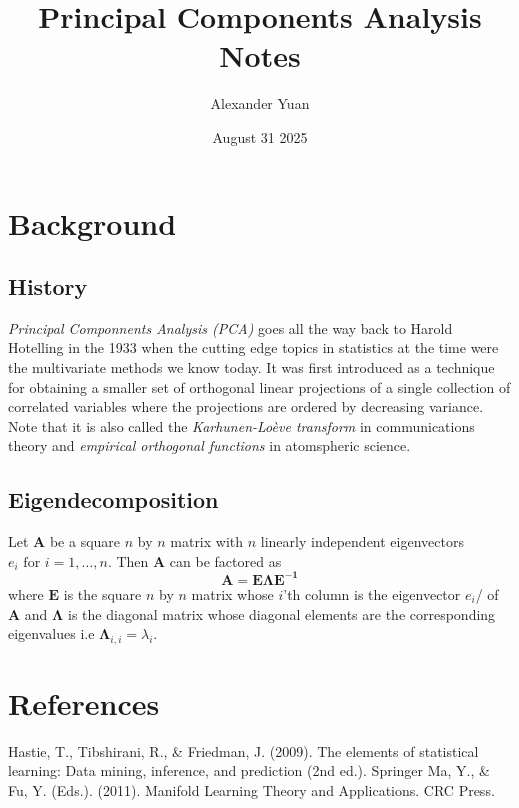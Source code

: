 \documentclass{article}
\title{Principal Components Analysis Notes}
\author{Alexander Yuan}
\date{August 31 2025}
\begin{document}
 
\maketitle

\section{Background}
\subsection{History}
\emph{Principal Componnents Analysis (PCA)} goes all the way back to Harold Hotelling in the 1933 when the cutting edge topics in statistics at the time were the multivariate methods we know today. It was first 
introduced as a technique for obtaining a smaller set of orthogonal linear projections of a single collection of correlated variables where the projections are ordered by decreasing variance. Note that it is also
called the \emph{Karhunen-Loève transform} in communications theory and \emph{empirical orthogonal functions} in atomspheric science.

\subsection{Eigendecomposition}
Let $\mathbf{A}$ be a square $n$ by $n$ matrix with $n$ linearly independent eigenvectors $e_i \text{ for } i = 1, \ldots , n$. Then $\mathbf{A}$ can be factored as 
$$
\mathbf{A = E \Lambda E^{-1}}
$$
where $\mathbf{E}$ is the square $n$ by $n$ matrix whose $i$'th column is the eigenvector $e_i$/ of $\mathbf{A}$ and $\mathbf{\Lambda}$ is the diagonal matrix whose diagonal elements are the corresponding eigenvalues 
i.e $\mathbf{\Lambda}_{i,i}= \lambda_i$.


\section{References}
Hastie, T., Tibshirani, R., \& Friedman, J. (2009). The elements of statistical learning: Data mining, inference, and prediction (2nd ed.). Springer \newline \newline 
Ma, Y., \& Fu, Y. (Eds.). (2011). Manifold Learning Theory and Applications. CRC Press.
\end{document}
